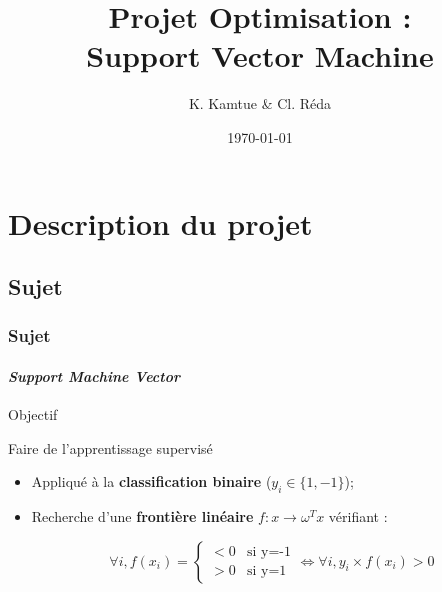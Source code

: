 \documentclass{beamer}
\title{Projet Optimisation :\\Support Vector Machine}
\author{K. Kamtue \& Cl. Réda}
\institute{\textsc{ENS Cachan}}
\date{\today}
\begin{document}
\maketitle
\tableofcontents
\setlength{\parindent}{1cm}

\section{Description du projet}

\subsection{Sujet}

\begin{frame}
\tableofcontents[currentsubsection]
\end{frame}

\begin{frame}
\frametitle{Sujet}
\framesubtitle{\emph{Support Machine Vector}}

\begin{alertblock}{Objectif}
\begin{center}
Faire de l'apprentissage supervisé
\end{center}
\end{alertblock}

\pause

\begin{itemize}
\item Appliqué à la \textbf{classification binaire} ($y_i \in \{1, -1\}$);

\pause

\item Recherche d'une \textbf{frontière linéaire} $f : x \rightarrow \omega^Tx$ vérifiant :

         
          \begin{center}
           \begin{equation}
         \forall i, f(x_i) = 
         \begin{cases}
         <0 &\mbox {si y=-1} \\
         >0 &\mbox {si y=1}
         \end{cases}
         \Leftrightarrow \forall i, y_i \times f(x_i) > 0 
         \end{equation}
         \end{center}
\end{itemize}

\end{frame}
\end{document}
